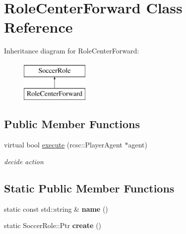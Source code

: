 \hypertarget{classRoleCenterForward}{
\section{RoleCenterForward Class Reference}
\label{classRoleCenterForward}
}
Inheritance diagram for RoleCenterForward:\begin{figure}[H]
\begin{center}
\leavevmode
\includegraphics[height=2.000000cm]{classRoleCenterForward}
\end{center}
\end{figure}
\subsection*{Public Member Functions}
\begin{DoxyCompactItemize}
\item 
\hypertarget{classRoleCenterForward_a3b55ff097462d7db0081386f09854584}{
virtual bool \hyperlink{classRoleCenterForward_a3b55ff097462d7db0081386f09854584}{execute} (rcsc::PlayerAgent $\ast$agent)}
\label{classRoleCenterForward_a3b55ff097462d7db0081386f09854584}

\begin{DoxyCompactList}\small\item\em decide action \item\end{DoxyCompactList}\end{DoxyCompactItemize}
\subsection*{Static Public Member Functions}
\begin{DoxyCompactItemize}
\item 
\hypertarget{classRoleCenterForward_a460cedf3dcc4ce8b0be23201350355a3}{
static const std::string \& {\bfseries name} ()}
\label{classRoleCenterForward_a460cedf3dcc4ce8b0be23201350355a3}

\item 
\hypertarget{classRoleCenterForward_ab35dbf22f33669820d8ffd68686a5a14}{
static SoccerRole::Ptr {\bfseries create} ()}
\label{classRoleCenterForward_ab35dbf22f33669820d8ffd68686a5a14}

\end{DoxyCompactItemize}
